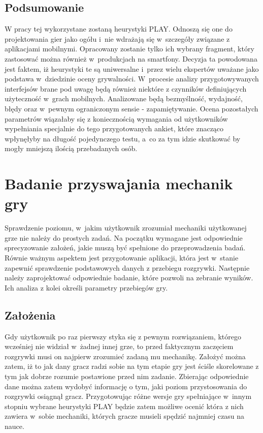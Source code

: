 \documentclass[a4paper,12pt,numbers=noenddot]{report}
\begin{document}
\section{Podsumowanie}
W pracy tej wykorzystane zostaną heurystyki PLAY. Odnoszą się one do projektowania gier jako ogółu i~nie wdrażają się w~szczegóły związane z aplikacjami mobilnymi. Opracowany zostanie tylko ich wybrany fragment, który zastosować można również w~produkcjach na smartfony. Decyzja ta powodowana jest faktem, iż heurystyki te są uniwersalne i~przez wielu ekspertów uważane jako podstawa w~dziedzinie oceny grywalności. W~procesie analizy przygotowywanych interfejsów brane pod uwagę będą również niektóre z czynników definiujących użyteczność w~grach mobilnych. Analizowane będą bezmyślność, wydajność, błędy oraz w~pewnym ograniczonym sensie - zapamiętywanie. Ocena pozostałych parametrów wiązałaby się z koniecznością wymagania od użytkowników wypełniania specjalnie do tego przygotowanych ankiet, które znacząco wpłynęłyby na długość pojedynczego testu, a~co za tym idzie skutkować by mogły mniejszą ilością przebadanych osób.

\chapter{Badanie przyswajania mechanik gry}
Sprawdzenie poziomu, w~jakim użytkownik zrozumiał mechaniki użytkowanej grze nie należy do prostych zadań. Na początku wymagane jest odpowiednie sprecyzowanie założeń, jakie muszą być spełnione do przeprowadzenia badań. Równie ważnym aspektem jest przygotowanie aplikacji, która jest w~stanie zapewnić sprawdzenie podstawowych danych z przebiegu rozgrywki. Następnie należy zaprojektować odpowiednie badanie, które pozwoli na zebranie wyników. Ich analiza z kolei określi parametry przebiegów gry.
\section{Założenia}
Gdy użytkownik po raz pierwszy styka się z pewnym rozwiązaniem, którego wcześniej nie widział w~żadnej innej grze, to przed faktycznym zaczęciem rozgrywki musi on najpierw zrozumieć zadaną mu mechanikę. Założyć można zatem, iż to jak dany gracz radzi sobie na tym etapie gry jest ściśle skorelowane z tym jak dobrze rozumie postawione przed nim zadanie. Zbierając odpowiednie dane można zatem wydobyć informację o tym, jaki poziom przystosowania do rozgrywki osiągnął gracz. Przygotowując różne wersje gry spełniające w~innym stopniu wybrane heurystyki PLAY będzie zatem możliwe ocenić która z nich zawiera w~sobie mechaniki, których gracze musieli spędzić najmniej czasu na nauce.
\end{document}
